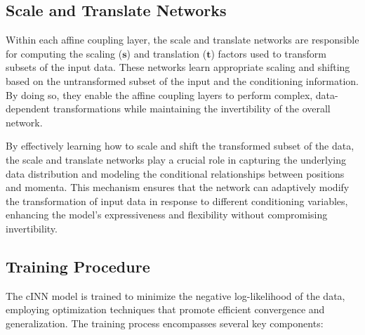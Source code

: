 \documentclass[11pt]{paper}
\begin{document}
\subsection{Scale and Translate Networks}

Within each affine coupling layer, the scale and translate networks are responsible for computing the scaling ($\mathbf{s}$) and translation ($\mathbf{t}$) factors used to transform subsets of the input data. These networks learn appropriate scaling and shifting based on the untransformed subset of the input and the conditioning information. By doing so, they enable the affine coupling layers to perform complex, data-dependent transformations while maintaining the invertibility of the overall network.

By effectively learning how to scale and shift the transformed subset of the data, the scale and translate networks play a crucial role in capturing the underlying data distribution and modeling the conditional relationships between positions and momenta. This mechanism ensures that the network can adaptively modify the transformation of input data in response to different conditioning variables, enhancing the model's expressiveness and flexibility without compromising invertibility.

\subsection{Training Procedure}

The cINN model is trained to minimize the negative log-likelihood of the data, employing optimization techniques that promote efficient convergence and generalization. The training process encompasses several key components:
\end{document}
